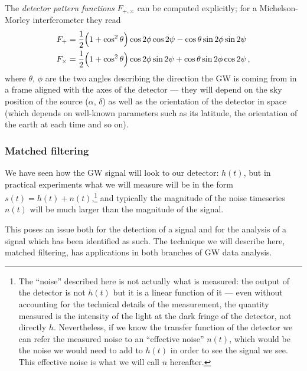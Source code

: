 \documentclass[main.tex]{subfiles}
\begin{document}
The \emph{detector pattern functions} \(F_{+, \times }\) can be computed explicitly; for a Michelson-Morley interferometer they read 
%
\begin{align}
F_{+} &= \frac{1}{2} \qty(1 + \cos^2 \theta ) \cos 2 \phi \cos 2 \psi - \cos \theta \sin 2 \phi \sin 2 \psi   \\
F_{ \times } &= \frac{1}{2} \qty(1 + \cos^2 \theta ) \cos 2 \phi \sin 2 \psi + \cos \theta \sin 2 \phi \cos 2 \psi  
\,,
\end{align}
%
where \(\theta \), \(\phi \) are the two angles describing the direction the \ac{GW} is coming from in a frame aligned with the axes of the detector --- they will depend on the sky position of the source (\(\alpha \), \(\delta \)) as well as the orientation of the detector in space (which depends on well-known parameters such as its latitude, the orientation of the earth at each time and so on).

\subsubsection{Matched filtering}

We have seen how the \ac{GW} signal will look to our detector: \(h(t)\), but in practical experiments what we will measure will be in the form \(s(t) = h(t) + n(t)\),\footnote{The ``noise'' described here is not actually what is measured: the output of the detector is not \(h(t)\) but it is a linear function of it --- even without accounting for the technical details of the measurement, the quantity measured is the intensity of the light at the dark fringe of the detector, not directly \(h\). Nevertheless, if we know the transfer function of the detector we can refer the measured noise to an ``effective noise'' \(n(t)\), which would be the noise we would need to add to \(h(t)\) in order to see the signal we see. This effective noise is what we will call \(n\) hereafter.} and typically the magnitude of the noise timeseries \(n(t)\) will be much larger than the magnitude of the signal. 

This poses an issue both for the detection of a signal and for the analysis of a signal which has been identified as such. 
The technique we will describe here, matched filtering, has applications in both branches of \ac{GW} data analysis.
\end{document}
